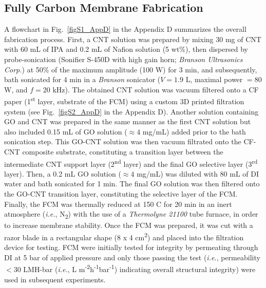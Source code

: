 \subsection{Fully Carbon Membrane Fabrication}
A flowchart in Fig.~\ref{figS1_AppD} in the Appendix D summarizes the overall fabrication process. First, a CNT solution was prepared by mixing 30 mg of CNT with 60 mL of IPA and 0.2 mL of Nafion solution (5 wt\%), then dispersed by probe-sonication (Sonifier S-450D with high gain horn; \textit{Branson Ultrasonics Corp.}) at 50\% of the maximum amplitude (100 W) for 3 min, and subsequently, bath sonicated for 4 min in a \textit{Branson} sonicator ($V=1.9$ L, maximal power $=80$ W, and $f=20$ kHz). The obtained CNT solution was vacuum filtered onto a CF paper (1\textsuperscript{st} layer, substrate of the FCM) using a custom 3D printed filtration system (see Fig.~\ref{figS2_AppD} in the Appendix D). Another solution containing GO and CNT was prepared in the same manner as the first CNT solution but also included 0.15 mL of GO solution ($\approx4$ mg/mL) added prior to the bath sonication step. This GO-CNT solution was then vacuum filtrated onto the CF-CNT composite substrate, constituting a transition layer between the intermediate CNT support layer (2\textsuperscript{nd} layer) and the final GO selective layer (3\textsuperscript{rd} layer). Then, a 0.2 mL GO solution ($\approx4$ mg/mL) was diluted with 80 mL of DI water and bath sonicated for 1 min. The final GO solution was then filtered onto the GO-CNT transition layer, constituting the selective layer of the FCM. Finally, the FCM was thermally reduced at 150 \textdegree C for 20 min in an inert atmosphere (\textit{i.e.}, N\textsubscript{2}) with the use of a \textit{Thermolyne 21100} tube furnace, in order to increase membrane stability. Once the FCM was prepared, it was cut with a razor blade in a rectangular shape (8 x 4 cm\textsuperscript{2}) and placed into the filtration device for testing. FCM were initially tested for integrity by permeating through DI at 5 bar of applied pressure and only those passing the test (\textit{i.e.}, permeability $<30$ LMH-bar (\textit{i.e.}, L m\textsuperscript{-2}h\textsuperscript{-1}bar\textsuperscript{-1}) indicating overall structural integrity) were used in subsequent experiments.


